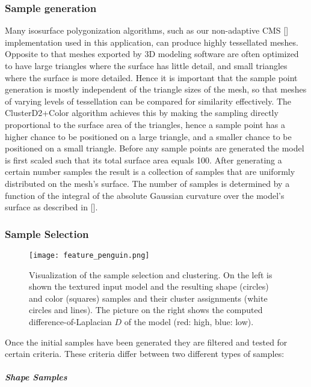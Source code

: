 \subsubsection{Sample generation}

Many isosurface polygonization algorithms, such as our non-adaptive CMS []
implementation used in this application, can produce highly tessellated meshes. Opposite to that meshes exported by
3D modeling software are often optimized to have large triangles where the surface has little detail, and small triangles where
the surface is more detailed. Hence it is important that the sample point generation is mostly independent of the triangle sizes
of the mesh, so that meshes of varying levels of tessellation can be compared for similarity effectively.
The ClusterD2+Color algorithm achieves this by making the sampling directly proportional to the surface area of the triangles, hence a sample point
has a higher chance to be positioned on a large triangle, and a smaller chance to be positioned on a small triangle.
Before any sample points are generated the model is first scaled such that its total surface area equals 100.
After generating a certain number samples the result is a collection of samples that are uniformly distributed on the mesh's surface. The number of samples
is determined by a function of the integral of the absolute Gaussian curvature over the model's surface as described in [].

\subsubsection{Sample Selection}

\begin{figure}
\centering
\captionsetup{width=0.8\textwidth}
\texttt{[image: feature\_penguin.png]}
\caption{Visualization of the sample selection and clustering. On the left is shown the textured input model and the resulting shape (circles) and color (squares) samples
and their cluster assignments (white circles and lines). The picture on the right shows the computed difference-of-Laplacian $D$ of the model (red: high, blue: low).}
\label{fig:feature_penguin}
\end{figure}

Once the initial samples have been generated they are filtered and tested for certain criteria.
These criteria differ between two different types of samples:

\subparagraph{Shape Samples}

